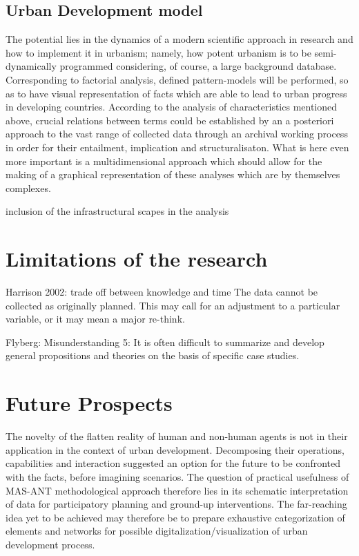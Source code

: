 \documentclass[11pt]{report}
\begin{document}
\subsection{Urban Development model}

The potential lies in the dynamics of a modern scientific approach in research and how to implement it in urbanism; namely, how potent urbanism is to be semi-dynamically programmed considering, of course, a large background database. 
Corresponding to factorial analysis, defined pattern-models will be performed, so as to have visual representation of facts which are able to lead to urban progress in developing countries.
According to the analysis of characteristics mentioned above, crucial relations between terms could be established by an a posteriori approach to the vast range of collected data through an archival working process in order for their entailment, implication and structuralisaton.
What is here even more important is a multidimensional approach which should allow for the making of a graphical representation of these analyses which are by themselves complexes.

inclusion of the infrastructural scapes in the analysis

\section{Limitations of the research}

Harrison 2002:
trade off between knowledge and time
The data cannot be collected as originally planned. This may call for an
adjustment to a particular variable, or it may mean a major re-think.

Flyberg:
Misunderstanding 5: It is often difficult to summarize and develop general propositions and theories on the basis of specific case studies.

\section{Future Prospects}

The novelty of the flatten reality of human and non-human agents is not in their application in the context of urban development. Decomposing their operations, capabilities and interaction suggested an option for the future to be confronted with the facts, before imagining scenarios. The question of practical usefulness of MAS-ANT methodological approach therefore lies in its schematic interpretation of data for participatory planning and ground-up interventions. The far-reaching idea yet to be achieved may therefore be to prepare exhaustive categorization of elements and networks for possible digitalization/visualization of urban development process.
\end{document}
